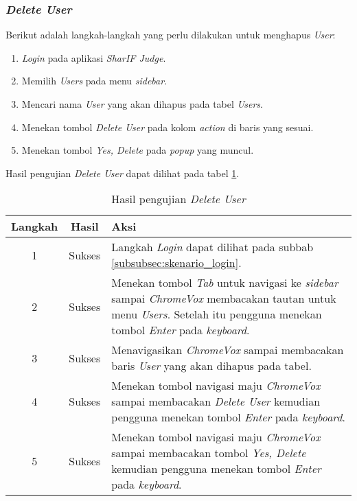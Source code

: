 \subsubsection{\textit{Delete User}}
\label{subsubsec:skenario_delete_user}
Berikut adalah langkah-langkah yang perlu dilakukan untuk menghapus \textit{User}:

\begin{enumerate}
	\item \textit{Login} pada aplikasi \textit{SharIF Judge}.
	\item Memilih \textit{Users} pada menu \textit{sidebar}.
	\item Mencari nama \textit{User} yang akan dihapus pada tabel \textit{Users}.
	\item Menekan tombol \textit{Delete User} pada kolom \textit{action} di baris yang sesuai.
	\item Menekan tombol \textit{Yes, Delete} pada \textit{popup} yang muncul.
\end{enumerate}

Hasil pengujian \textit{Delete User} dapat dilihat pada tabel \ref{tab:hasil_delete_user}.

\begin{table}[H]
	\centering
	\caption{Hasil pengujian \textit{Delete User}}
	\label{tab:hasil_delete_user}
	\begin{tabular}{|c|c|p{12cm}|}
		\toprule
		Langkah & Hasil & Aksi\\
		\midrule
		1 & Sukses & Langkah \textit{Login} dapat dilihat pada subbab \ref{subsubsec:skenario_login}.\\
		2 & Sukses & Menekan tombol \textit{Tab} untuk navigasi ke \textit{sidebar} sampai \textit{ChromeVox} membacakan tautan untuk menu \textit{Users}. Setelah itu pengguna menekan tombol \textit{Enter} pada \textit{keyboard}.\\
		3 & Sukses & Menavigasikan \textit{ChromeVox} sampai membacakan baris \textit{User} yang akan dihapus pada tabel.\\
		4 & Sukses & Menekan tombol navigasi maju \textit{ChromeVox} sampai membacakan \textit{Delete User} kemudian pengguna menekan tombol \textit{Enter} pada \textit{keyboard}.\\
		5 & Sukses & Menekan tombol navigasi maju \textit{ChromeVox} sampai membacakan tombol \textit{Yes, Delete} kemudian pengguna menekan tombol \textit{Enter} pada \textit{keyboard}.\\
		\bottomrule
	\end{tabular}
\end{table}

